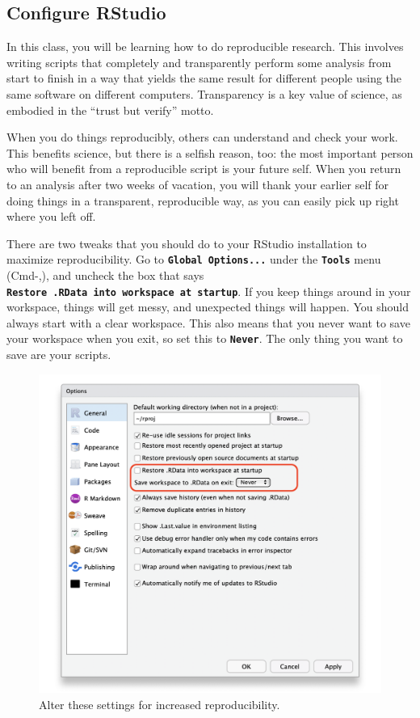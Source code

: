 \documentclass[
  oneside]{book}
\begin{document}
\hypertarget{configure-rstudio}{%
\subsection{Configure RStudio}\label{configure-rstudio}}

In this class, you will be learning how to do reproducible research. This involves writing scripts that completely and transparently perform some analysis from start to finish in a way that yields the same result for different people using the same software on different computers. Transparency is a key value of science, as embodied in the ``trust but verify'' motto.

When you do things reproducibly, others can understand and check your work. This benefits science, but there is a selfish reason, too: the most important person who will benefit from a reproducible script is your future self. When you return to an analysis after two weeks of vacation, you will thank your earlier self for doing things in a transparent, reproducible way, as you can easily pick up right where you left off.

There are two tweaks that you should do to your RStudio installation to maximize reproducibility. Go to \textbf{\texttt{Global\ Options...}} under the \textbf{\texttt{Tools}} menu (Cmd-,), and uncheck the box that says \textbf{\texttt{Restore\ .RData\ into\ workspace\ at\ startup}}. If you keep things around in your workspace, things will get messy, and unexpected things will happen. You should always start with a clear workspace. This also means that you never want to save your workspace when you exit, so set this to \textbf{\texttt{Never}}. The only thing you want to save are your scripts.

\begin{figure}

{\centering \includegraphics[width=0.66\linewidth]{images/01/repro} 

}

\caption{Alter these settings for increased reproducibility.}\label{fig:img-repro}
\end{figure}
\end{document}
